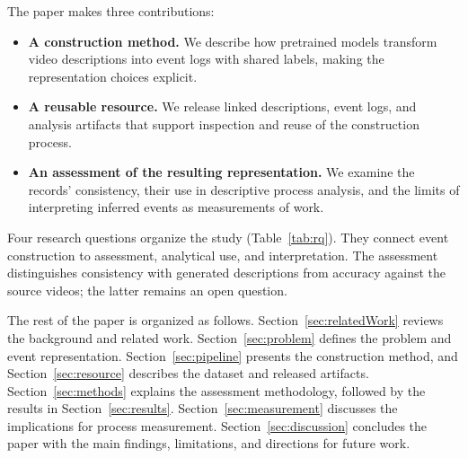 The paper makes three contributions:
\begin{itemize}
\item \textbf{A construction method.} We describe how pretrained models transform video descriptions into event logs with shared labels, making the representation choices explicit.
\item \textbf{A reusable resource.} We release linked descriptions, event logs, and analysis artifacts that support inspection and reuse of the construction process.
\item \textbf{An assessment of the resulting representation.} We examine the records' consistency, their use in descriptive process analysis, and the limits of interpreting inferred events as measurements of work.
\end{itemize}

Four research questions organize the study (Table~\ref{tab:rq}). They connect event construction to assessment, analytical use, and interpretation. The assessment distinguishes consistency with generated descriptions from accuracy against the source videos; the latter remains an open question.

The rest of the paper is organized as follows. Section~\ref{sec:relatedWork} reviews the background and related work. Section~\ref{sec:problem} defines the problem and event representation. Section~\ref{sec:pipeline} presents the construction method, and Section~\ref{sec:resource} describes the dataset and released artifacts. Section~\ref{sec:methods} explains the assessment methodology, followed by the results in Section~\ref{sec:results}. Section~\ref{sec:measurement} discusses the implications for process measurement. Section~\ref{sec:discussion} concludes the paper with the main findings, limitations, and directions for future work.
